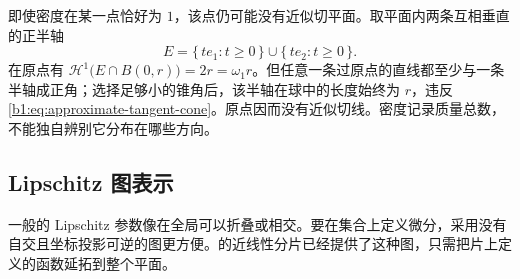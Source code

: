 \ProseParagraphBreak

即使密度在某一点恰好为 \(1\)，该点仍可能没有近似切平面。取平面内两条互相垂直的正半轴
\[
 E=\{\,te_1:t\geq0\,\}\cup\{\,te_2:t\geq0\,\}.
\]
在原点有 \(\mathcal H^1\bigl(E\cap B(0,r)\bigr)=2r=\omega_1r\)。但任意一条过原点的直线都至少与一条半轴成正角；选择足够小的锥角后，该半轴在球中的长度始终为 \(r\)，违反\eqref{b1:eq:approximate-tangent-cone}。原点因而没有近似切线。密度记录质量总数，不能独自辨别它分布在哪些方向。

\subsection{Lipschitz 图表示}
\label{b1:subsec:190204}

一般的 Lipschitz 参数像在全局可以折叠或相交。要在集合上定义微分，采用没有自交且坐标投影可逆的图更方便。的近线性分片已经提供了这种图，只需把片上定义的函数延拓到整个平面。

